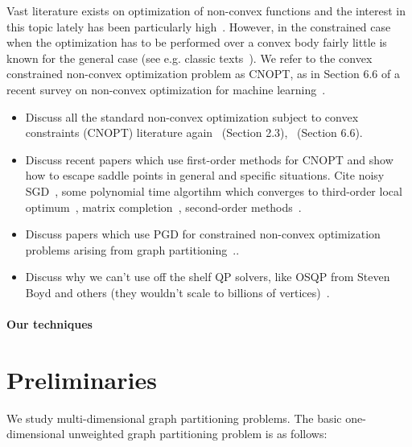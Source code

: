 Vast literature exists on optimization of non-convex functions and the interest in this topic lately has been particularly high~\cite{}. However, in the constrained case when the optimization has to be performed over a convex body fairly little is known for the general case (see e.g. classic texts~\cite{B99,WN99,BV04}). We refer to the convex constrained non-convex optimization problem as CNOPT, as in Section 6.6 of a recent survey on non-convex optimization for machine learning~\cite{JK17}.

\begin{itemize}
\item Discuss all the standard non-convex optimization subject to convex constraints (CNOPT) literature again~\cite{B99} (Section 2.3),~\cite{JK17} (Section 6.6).
\item Discuss recent papers which use first-order methods for CNOPT and show how to escape saddle points in general and specific situations. Cite noisy SGD~\cite{GHJY15}, some polynomial time algortihm which converges to third-order local optimum~\cite{AG16}, matrix completion~\cite{GLM16}, second-order methods~\cite{SQW15}.
\item Discuss papers which use PGD for constrained non-convex optimization problems arising from graph partitioning~\cite{LRSST10}..
\item Discuss why we can't use off the shelf QP solvers, like OSQP from Steven Boyd and others (they wouldn't scale to billions of vertices)~\cite{SBGBB17}.
\end{itemize}

\paragraph{Our techniques}



\section{Preliminaries}\label{sec:mdbgp-definitions}

We study multi-dimensional graph partitioning problems. The basic one-dimensional unweighted graph partitioning problem is as follows: 

